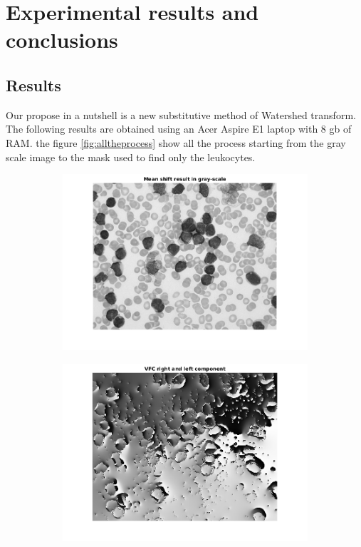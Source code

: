 \chapter{Experimental results and conclusions}
\section{Results}
Our propose in a nutshell is a new substitutive method of Watershed transform. The following results are obtained using an Acer Aspire E1 laptop with 8 gb of RAM. the figure \ref{fig:alltheprocess} show all the process starting from the gray scale image to the mask used to find only the leukocytes.
\begin{figure}[htbp]
    \centering
    \begin{subfigure}[b]{0.4\textwidth}
        \includegraphics[width=\textwidth]{img/final/figure1.png}
        \caption{ }
        \label{fig:fig1}
    \end{subfigure}
    \begin{subfigure}[b]{0.4\textwidth}
        \includegraphics[width=\textwidth]{img/final/figure2.png}

\end{subfigure}
\end{figure}
